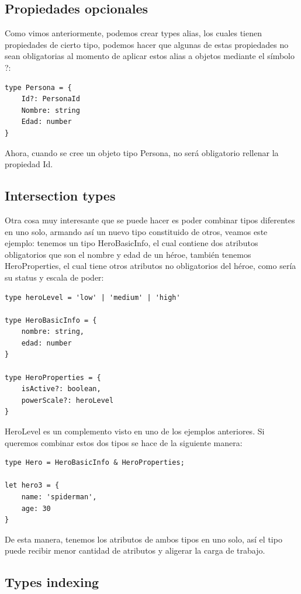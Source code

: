 \subsection{Propiedades opcionales}

Como vimos anteriormente, podemos crear types alias, los cuales tienen propiedades de cierto tipo, podemos hacer que algunas de estas propiedades no sean obligatorias al momento de aplicar estos alias a objetos mediante el símbolo ?:
\begin{lstlisting}
type Persona = {
    Id?: PersonaId
    Nombre: string
    Edad: number
}
\end{lstlisting}

Ahora, cuando se cree un objeto tipo Persona, no será obligatorio rellenar la propiedad Id.


\subsection{Intersection types}

Otra cosa muy interesante que se puede hacer es poder combinar tipos diferentes en uno solo, armando así un nuevo tipo constituido de otros, veamos este ejemplo: tenemos un tipo HeroBasicInfo, el cual contiene dos atributos obligatorios que son el nombre y edad de un héroe, también tenemos HeroProperties, el cual tiene otros atributos no obligatorios del héroe, como sería su status y escala de poder:

\begin{lstlisting}
type heroLevel = 'low' | 'medium' | 'high'

type HeroBasicInfo = {
    nombre: string,
    edad: number
}

type HeroProperties = {
    isActive?: boolean,
    powerScale?: heroLevel
}
\end{lstlisting}

HeroLevel es un complemento visto en uno de los ejemplos anteriores. Si queremos combinar estos dos tipos se hace de la siguiente manera:
\begin{lstlisting}
type Hero = HeroBasicInfo & HeroProperties;

let hero3 = {
    name: 'spiderman',
    age: 30
}
\end{lstlisting}

De esta manera, tenemos los atributos de ambos tipos en uno solo, así el tipo puede recibir menor cantidad de atributos y aligerar la carga de trabajo.


\subsection{Types indexing}

